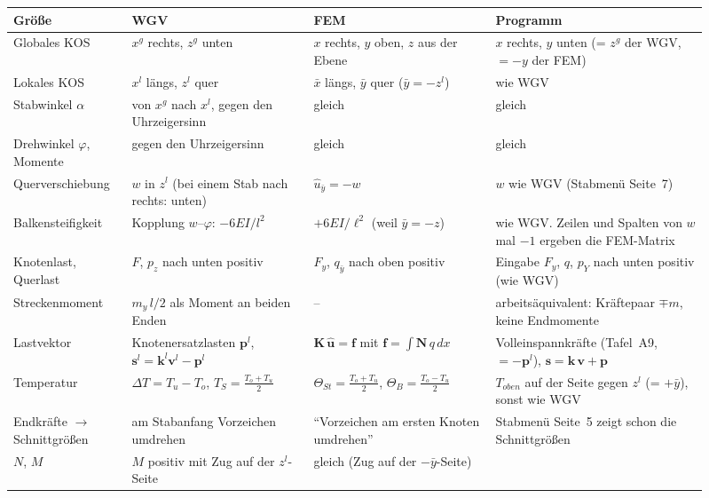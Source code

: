 \begin{longtable}{>{\raggedright\arraybackslash}p{0.15\linewidth}>{\raggedright\arraybackslash}p{0.24\linewidth}>{\raggedright\arraybackslash}p{0.24\linewidth}>{\raggedright\arraybackslash}p{0.28\linewidth}}
  \toprule
  \textbf{Größe} & \textbf{WGV} & \textbf{FEM} & \textbf{Programm} \\
  \midrule \endhead
  Globales KOS & $x^g$ rechts, $z^g$ unten & $x$ rechts, $y$ oben, $z$ aus der Ebene &
    $x$ rechts, $y$ unten (= $z^g$ der WGV, $= -y$ der FEM) \\
  Lokales KOS & $x^l$ längs, $z^l$ quer & $\bar x$ längs, $\bar y$ quer ($\bar y = -z^l$) &
    wie WGV \\
  Stabwinkel $\alpha$ & von $x^g$ nach $x^l$, gegen den Uhrzeigersinn & gleich & gleich \\
  Drehwinkel $\varphi$, Momente & gegen den Uhrzeigersinn & gleich & gleich \\
  Quer\-verschie\-bung & $w$ in $z^l$ (bei einem Stab nach rechts: unten) & $\hat u_{\bar y} = -w$ &
    $w$ wie WGV (Stabmenü Seite~7) \\
  Balken\-steifig\-keit & Kopplung $w$--$\varphi$: $-6EI/l^2$ & $+6EI/\ell^2$ (weil $\bar y = -z$) &
    wie WGV. Zeilen und Spalten von $w$ mal $-1$ ergeben die FEM-Matrix \\
  Knotenlast, Querlast & $F$, $p_z$ nach unten positiv & $F_y$, $q_{\bar y}$ nach oben positiv &
    Eingabe $F_y$, $q$, $p_Y$ nach unten positiv (wie WGV) \\
  Strecken\-moment & $m_y\,l/2$ als Moment an beiden Enden & -- &
    arbeitsäquivalent: Kräftepaar $\mp m$, keine Endmomente \\
  Lastvektor & Knotenersatzlasten $\mathbf p^l$, $\mathbf s^l = \mathbf k^l \mathbf v^l - \mathbf p^l$ &
    $\mathbf K\,\hat{\mathbf u} = \mathbf f$ mit $\mathbf f = \int \mathbf N\,q\,dx$ &
    Volleinspannkräfte (Tafel~A9, $= -\mathbf p^l$), $\mathbf s = \mathbf k\,\mathbf v + \mathbf p$ \\
  Temperatur & $\Delta T = T_u - T_o$, $T_S = \frac{T_o + T_u}2$ &
    $\Theta_{St} = \frac{T_o + T_u}2$, $\Theta_B = \frac{T_o - T_u}2$ &
    $T_{oben}$ auf der Seite gegen $z^l$ (= $+\bar y$), sonst wie WGV \\
  Endkräfte $\to$ Schnittgrößen & am Stabanfang Vorzeichen umdrehen &
    \enquote{Vorzeichen am ersten Knoten umdrehen} & Stabmenü Seite~5 zeigt schon die
    Schnittgrößen \\
  $N$, $M$ & $M$ positiv mit Zug auf der $z^l$-Seite & gleich (Zug auf der $-\bar y$-Seite) &

\end{longtable}
